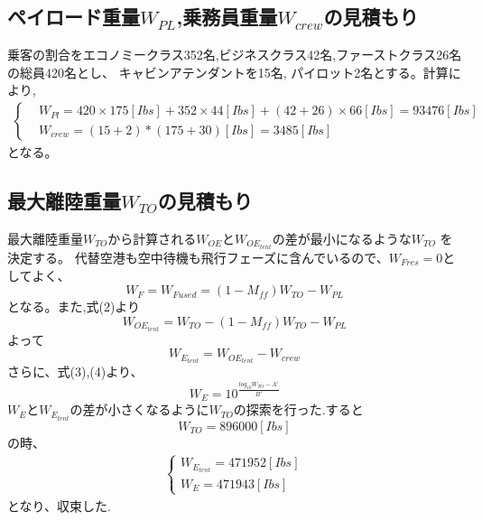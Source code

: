 \documentclass[../main]{subfiles}
\begin{document}
  \subsection{ペイロード重量$W_{PL}$,乗務員重量$W_{crew}$の見積もり}
    乗客の割合をエコノミークラス352名,ビジネスクラス42名,ファーストクラス26名の総員420名とし、
    キャビンアテンダントを15名, パイロット2名とする。計算により,
    \begin{eqnarray}
      \begin{cases}
        & W_{Pl} = 420 \times 175 [Ibs] + 352 \times 44 [Ibs] + (42+26) \times 66 [Ibs] = 93476[Ibs] \\[3mm]
        & W_{crew} = (15 + 2) * (175 + 30) [Ibs] = 3485 [Ibs]
      \end{cases}
    \end{eqnarray}
    となる。

  \subsection{最大離陸重量$W_{TO}$の見積もり}
    最大離陸重量$W_{TO}$から計算される$W_{OE}$と$W_{OE_{tent}}$の差が最小になるような$W_{TO}$
    を決定する。
    代替空港も空中待機も飛行フェーズに含んでいるので、$W_{Fres}=0$としてよく、
    \begin{equation}
      W_F = W_{Fused} = (1-M_{ff})W_{TO} - W_{PL}
    \end{equation}
    となる。また,式(2)より
    \begin{equation}
      W_{OE_{tent}} = W_{TO} - (1-M_{ff})W_{TO} - W_{PL}
    \end{equation}
    よって
    \begin{equation}
      W_{E_{tent}} = W_{OE_{tent}} - W_{crew}
    \end{equation}
    さらに、式(3),(4)より、
    \begin{equation}
      W_{E} = 10 ^ {\frac{log_{10}W_{TO} - A'}{B'}}
    \end{equation}
    $W_{E}$と$W_{E_{tent}}$の差が小さくなるように$W_{TO}$の探索を行った.すると
    \begin{equation}
      W_{TO} = 896000 [Ibs]
    \end{equation}
    の時、
    \begin{eqnarray}
      \begin{cases}
        W_{E_{tent}} = 471952 [Ibs] \\[3mm]
        W_{E} = 471943 [Ibs]
      \end{cases}
    \end{eqnarray}
    となり、収束した.
\end{document}
